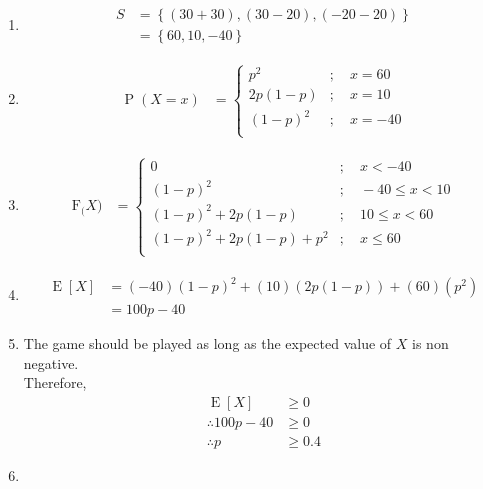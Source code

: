\documentclass[titlepage, fleqn, a4paper, 12pt, twoside]{article}
\theoremstyle{definition}
\theoremstyle{theorem}
\DeclareMathOperator{\prob}{\mathrm{P}}
\DeclareMathOperator{\expct}{\mathrm{E}}
\newcommand*{\cdf}[1]{\mathrm{F}_{#1}}
\begin{document}
\begin{solution}
	\begin{enumerate}[leftmargin=*]
		\item
			\begin{align*}
				S & = \left\{ (30 + 30) , (30 - 20) , (-20 - 20) \right\} \\
                                  & = \left\{ 60 , 10 , -40 \right\}
			\end{align*}
		\item
			\begin{align*}
				\prob(X = x) &=
					\begin{cases}
						p^2         & ;\quad x = 60  \\
						2 p (1 - p) & ;\quad x = 10  \\
						(1 - p)^2   & ;\quad x = -40 \\
					\end{cases}
			\end{align*}
		\item
			\begin{align*}
				\cdf(X) &=
					\begin{cases}
						0                             & ;\quad x < -40        \\
						(1 - p)^2                     & ;\quad -40 \le x < 10 \\
						(1 - p)^2 + 2 p (1 - p)       & ;\quad 10 \le x < 60  \\
						(1 - p)^2 + 2 p (1 - p) + p^2 & ;\quad x \le 60       \\
					\end{cases}
			\end{align*}
		\item
			\begin{align*}
				\expct[X] & = (-40) (1 - p)^2 + (10) \left( 2 p (1 - p) \right) + (60) \left( p^2 \right) \\
                                          & = 100p - 40
			\end{align*}
		\item
			The game should be played as long as the expected value of $X$ is non negative.\\
			Therefore,
			\begin{align*}
				\expct[X]             & \ge 0 \\
				\therefore 100 p - 40 & \ge 0 \\
				\therefore p          & \ge 0.4
			\end{align*}
		\item
			\begin{align*}

\end{align*}
\end{enumerate}
\end{solution}
\end{document}

